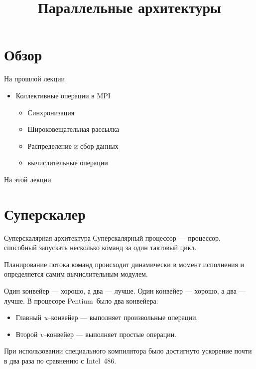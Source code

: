 

\title{Параллельные архитектуры}



\begin{frame}
\titlepage
\end{frame}

\section*{Обзор}

\begin{frame}{На прошлой лекции}
\begin{itemize}
    \item Коллективные операции в MPI
    \begin{itemize}
        \item Синхронизация
        \item Широковещательная рассылка
        \item Распределение и сбор данных
        \item вычислительные операции
    \end{itemize}
\end{itemize}
\end{frame}

\begin{frame}{На этой лекции}
\tableofcontents
\end{frame}

\section{Суперскалер}

\begin{frame}{Суперскалярная архитектура}
Суперскалярный процессор --- процессор, способный запускать несколько команд за
один тактовый цикл.

\vspace*{1cm}\pause
Планирование потока команд происходит динамически в момент исполнения и определяется самим
вычислительным модулем.
\end{frame}

\begin{frame}{Один конвейер --- хорошо, а два --- лучше.}
Один конвейер --- хорошо, а два --- лучше.
\vfill\pause
В процесоре Pentium\textsuperscript\textregistered~было два конвейера:
\begin{itemize}
    \item Главный \textit{u--}конвейер --- выполняет произвольные операции,
    \item Второй \textit{v--}конвейер --- выполняет простые операции.
\end{itemize}
\vfill\pause
При использовании специального компилятора было достигнуто ускорение почти в два
раза по сравнению с Intel\textsuperscript\textregistered~486.
\end{frame}

